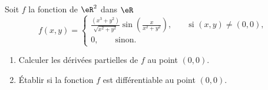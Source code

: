 \begin{exercice}\label{exoGeomAnal-0024}

Soit $f$ la fonction de $\eR^2$ dans $\eR$  
\begin{equation}
  f(x,y)=\begin{cases}
    \frac{(x^3+y^2)}{\sqrt{x^2+y^2}}\sin\left(\frac{x}{x^2+y^2}\right), \qquad\textrm{si } (x,y)\neq (0,0),\\
   0,  \qquad \textrm{sinon.}
  \end{cases}
\end{equation}
\begin{enumerate}
\item Calculer les dérivées partielles de $f$ au point $(0,0)$.
\item Établir si la fonction $f$ est différentiable au point $(0,0)$. 
\end{enumerate}

\end{exercice}
